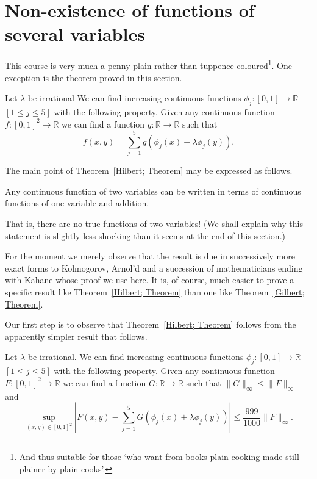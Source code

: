 \section{Non-existence of functions of several variables}
This course is very much a penny plain rather than tuppence
coloured\footnote{And thus suitable for those
`who want from books plain cooking made still
plainer by plain cooks'.}. One exception is the
theorem proved in this section.
\begin{theorem}\label{Hilbert; Theorem} Let $\lambda$ be irrational
We can find increasing continuous functions
$\phi_{j}:[0,1]\rightarrow{\mathbb R}$ $[1\leq j\leq 5]$
with the following property. Given any continuous
function
$f:[0,1]^{2}\rightarrow{\mathbb R}$ we can find a
function $g:{\mathbb R}\rightarrow{\mathbb R}$ such that
\[f(x,y)=\sum_{j=1}^{5}g(\phi_{j}(x)+\lambda\phi_{j}(y)).\]
\end{theorem}
The main point of Theorem~\ref{Hilbert; Theorem}
may be expressed as follows.
\begin{theorem}\label{Gilbert; Theorem}
Any continuous function of two variables
can be written in terms of 
continuous functions of one variable
and addition.
\end{theorem}
That is, there are no true functions of two variables!
(We shall explain why this statement is slightly
less shocking than it seems at the end of this section.)

For the moment we merely observe that the result is due
in successively more exact forms to Kolmogorov, Arnol'd
and a succession of mathematicians ending with Kahane 
whose proof we use here. It is, of course, much easier to
prove a specific result like Theorem~\ref{Hilbert; Theorem}
than one like Theorem~\ref{Gilbert; Theorem}.

Our first step is to observe that Theorem~\ref{Hilbert; Theorem}
follows from the apparently simpler result that follows.
\begin{lemma}\label{Hilbert A; Lemma} Let $\lambda$ be irrational.
We can find increasing continuous functions
$\phi_{j}:[0,1]\rightarrow{\mathbb R}$ $[1\leq j\leq 5]$
with the following property. Given any continuous
function
$F:[0,1]^{2}\rightarrow{\mathbb R}$ we can find a
function $G:{\mathbb R}\rightarrow{\mathbb R}$ such that
$\|G\|_{\infty}\leq\|F\|_{\infty}$ and 
\[\sup_{(x,y)\in[0,1]^{2}}
\left|F(x,y)-\sum_{j=1}^{5}G(\phi_{j}(x)+\lambda\phi_{j}(y))
\right|\leq \frac{999}{1000}\|F\|_{\infty}.\]
\end{lemma}

